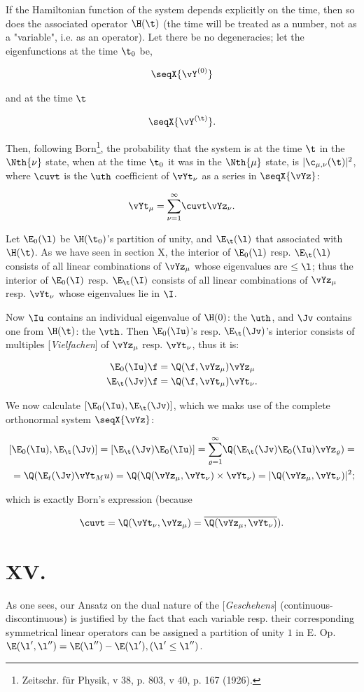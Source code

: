 \documentclass{article}
\newcommand{\WTF}[1]{
[\it{\small{#1}}]
}
\newcommand{\uequ}[1]{
\begin{align*}
#1
\end{align*}
}
\newcommand{\barred}[1]{
\overline{#1}
}
\renewcommand{\it}[1]{\textit{#1}}
\newcommand{\sumXY}[2]{\underset{#1}{\overset{#2}{\sum}}}
\begin{document}
If the Hamiltonian function of the system depends explicitly on the time, then so does the associated operator $\H(\t)$ (the time will be treated as a number, not as a "variable", i.e. as an operator). Let there be no degeneracies; let the eigenfunctions at the time $\t_0$ be,
\uequ{
\seqX{\vY^{(0)}}
}
and at the time $\t$
\uequ{
\seqX{\vY^{(\t)}}.
}

Then, following Born\footnote{Zeitschr. für Physik, v 38, p. 803, v 40, p. 167 (1926).}, the probability that the system is at the time $\t$ in the $\Nth{\nu}$ state, when at the time $\t_0$ it was in the $\Nth{\mu}$ state, is $|\c_{\mu,\nu}(\t)|^2$, where $\cuvt$ is the $\uth$ coefficient of $\vYt_\nu$ as a series in $\seqX{\vYz}$:
\uequ{
\vYt_\mu = \sumXY{\nu=1}{\infty}\cuvt\vYz_\nu.
}

Let $\E_0(\l)$ be $\H(\t_0)$'s partition of unity, and $\E_\t(\l)$ that associated with $\H(\t)$. As we have seen in section X, the interior of $\E_0(\l)$ resp. $\E_\t(\l)$ consists of all linear combinations of $\vYz_\mu$ whose eigenvalues are $\leq \l$; thus the interior of $\E_0(\I)$ resp. $\E_\t(\I)$ consists of all linear combinations of $\vYz_\mu$ resp. $\vYt_\nu$ whose eigenvalues lie in $\I$.

Now $\Iu$ contains an individual eigenvalue of $\H(0)$: the $\uth$, and $\Jv$ contains one from $\H(\t)$: the $\vth$. Then $\E_0(\Iu)$'s resp. $\E_\t(\Jv)$'s interior consists of multiples\WTF{Vielfachen} of $\vYz_\mu$ resp. $\vYt_\nu$, thus it is:
\uequ{
\E_0(\Iu)\f  &= \Q(\f, \vYz_\mu)\vYz_\mu\\
\E_\t(\Jv)\f &= \Q(\f, \vYt_\mu)\vYt_\nu.
}
We now calculate $[\E_0(\Iu),\E_\t(\Jv)]$, which we maks use of the complete orthonormal system $\seqX{\vYz}$:
\uequ{
[\E_0(\Iu),\E_\t(\Jv)] = [\E_\t(\Jv)\E_0(\Iu)] = \sumXY{\varrho=1}{\infty}\Q(\E_\t(\Jv)\E_0(\Iu)\vYz_\varrho) = \\
 = \Q(\E_t(\Jv)\vYt_Mu) = \Q(\Q(\vYz_\mu, \vYt_\nu)\times\vYt_\nu) = |\Q(\vYz_\mu,\vYt_\nu)|^2;
}
which is exactly Born's expression (because
\uequ{
\cuvt = \Q(\vYt_\nu,\vYz_\mu) = \barred{\Q(\vYz_\mu,\vYt_\nu)}).
}

\part*{XV.}
As one sees, our Ansatz on the dual nature of the \WTF{Geschehens} (continuous-discontinuous) is justified by the fact that each variable resp. their corresponding symmetrical linear operators can be assigned a partition of unity $1$ in E. Op. $\E(\l',\l'')=\E(\l'')-\E(\l'), (\l'\leq \l'')$.
\end{document}
